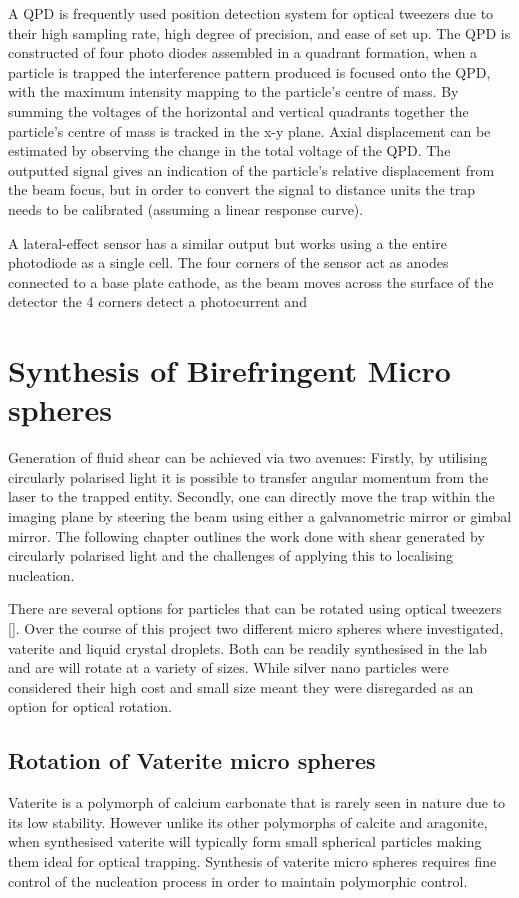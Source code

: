 A QPD is frequently used position detection system for optical 
tweezers due to their high sampling rate, high degree of 
precision, and ease of set up. The QPD is constructed of four photo 
diodes assembled in a quadrant formation, when a particle is trapped the 
interference pattern produced is focused onto the QPD, with 
the maximum intensity mapping to the particle's centre of mass. 
By summing the voltages of the horizontal and vertical quadrants 
together the particle's centre of mass is tracked in the x-y 
plane. Axial displacement can be estimated by observing the change
in the total voltage of the QPD. The outputted signal gives an
indication of the particle's relative displacement from the beam 
focus, but in order to convert the signal to distance units the
trap needs to be calibrated (assuming a linear response curve).

A lateral-effect sensor has a similar output but works using a 
the entire photodiode as a single cell. The four corners of 
the sensor act as anodes connected to a base plate cathode, as 
the beam moves across the surface of the detector the 4 corners
detect a photocurrent and 


\section{Synthesis of Birefringent Micro spheres}
\label{sec:vaterite}
Generation of fluid shear can be achieved via two avenues: Firstly, by 
utilising circularly polarised light it is possible to transfer angular 
momentum from the laser to the trapped entity. Secondly, one can 
directly move the trap within the imaging plane by steering the beam 
using either a galvanometric mirror or gimbal mirror. The following 
chapter outlines the work done with shear generated by circularly 
polarised light and the challenges of applying this to localising 
nucleation. 

There are several options for particles that can be rotated using 
optical tweezers []. Over the course of this project two different micro 
spheres where investigated, vaterite and liquid crystal droplets. Both 
can be readily synthesised in the lab and are will rotate at a variety 
of sizes. While silver nano particles were considered their high cost 
and small size meant they were disregarded as an option for optical 
rotation. 

\subsection{Rotation of Vaterite micro spheres}
Vaterite is a polymorph of calcium carbonate that is rarely seen in 
nature due to its low stability. However unlike its other polymorphs of 
calcite and aragonite, when synthesised vaterite will typically form 
small spherical particles making them ideal for optical trapping. 
Synthesis of vaterite micro spheres requires fine control of the nucleation process in order to maintain polymorphic control. 

